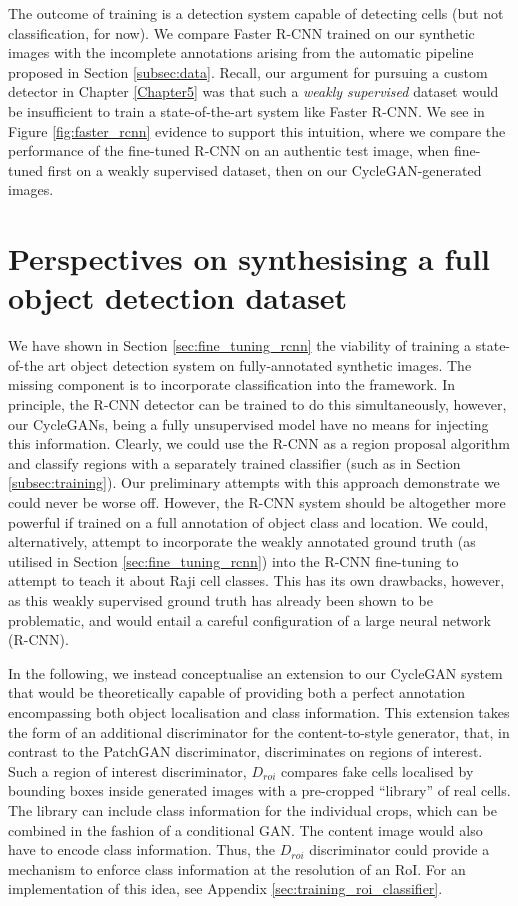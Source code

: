 The outcome of training is a detection system capable of detecting cells (but not classification, for now). We compare Faster R-CNN trained on our synthetic images with the incomplete annotations arising from the automatic pipeline proposed in Section \ref{subsec:data}. Recall, our argument for pursuing a custom detector in Chapter \ref{Chapter5} was that such a \emph{weakly supervised} dataset would be insufficient to train a state-of-the-art system like Faster R-CNN. We see in Figure \ref{fig:faster_rcnn} evidence to support this intuition, where we compare the performance of the fine-tuned R-CNN on an authentic test image, when fine-tuned first on a weakly supervised dataset, then on our CycleGAN-generated images.

\section{Perspectives on synthesising a full object detection dataset}

We have shown in Section \ref{sec:fine_tuning_rcnn} the viability of training a state-of-the art object detection system on fully-annotated synthetic images. The missing component is to incorporate classification into the framework. In principle, the R-CNN detector can be trained to do this simultaneously, however, our CycleGANs, being a fully unsupervised model have no means for injecting this information. Clearly, we could use the R-CNN as a region proposal algorithm and classify regions with a separately trained classifier (such as in Section \ref{subsec:training}). Our preliminary attempts with this approach demonstrate we could never be worse off. However, the R-CNN system should be altogether more powerful if trained on a full annotation of object class and location. We could, alternatively, attempt to incorporate the weakly annotated ground truth (as utilised in Section \ref{sec:fine_tuning_rcnn}) into the R-CNN fine-tuning to attempt to teach it about Raji cell classes. This has its own drawbacks, however, as this weakly supervised ground truth has already been shown to be problematic, and would entail a careful configuration of a large neural network (R-CNN).

In the following, we instead conceptualise an extension to our CycleGAN system that would be theoretically capable of providing both a perfect annotation encompassing both object localisation and class information. This extension takes the form of an additional discriminator for the content-to-style generator, that, in contrast to the PatchGAN discriminator, discriminates on regions of interest. Such a region of interest discriminator, $D_{roi}$ compares fake cells localised by bounding boxes inside generated images with a pre-cropped ``library'' of real cells. The library can include class information for the individual crops, which can be combined in the fashion of a conditional GAN. The content image would also have to encode class information. Thus, the $D_{roi}$ discriminator could provide a mechanism to enforce class information at the resolution of an RoI. For an implementation of this idea, see Appendix \ref{sec:training_roi_classifier}.

